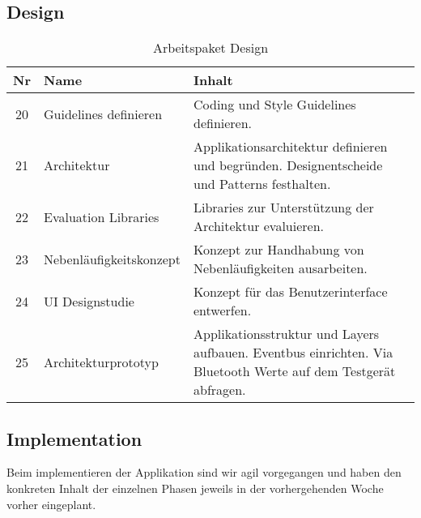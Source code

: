 \subsection{Design}
\begin{table}[H]
\begin{tabularx}{\textwidth}{ c | l | X }
\textbf{Nr} & \textbf{Name} & \textbf{Inhalt} \\ \hline
20 & Guidelines definieren & Coding und Style Guidelines definieren.\\ \hline
21 & Architektur & Applikationsarchitektur definieren und begründen. Designentscheide und Patterns festhalten.\\ \hline
22 & Evaluation Libraries & Libraries zur Unterstützung der Architektur evaluieren.\\ \hline
23 & Nebenläufigkeitskonzept & Konzept zur Handhabung von Nebenläufigkeiten ausarbeiten.\\ \hline
24 & UI Designstudie & Konzept für das Benutzerinterface entwerfen.\\ \hline
25 & Architekturprototyp & Applikationsstruktur und Layers aufbauen. Eventbus einrichten. Via Bluetooth Werte auf dem Testgerät abfragen.\\ 
\end{tabularx}
\caption{Arbeitspaket Design}
\end{table}

\pagebreak
\subsection{Implementation}

Beim implementieren der Applikation sind wir agil vorgegangen und haben den konkreten Inhalt der einzelnen Phasen jeweils in der vorhergehenden Woche vorher eingeplant.

